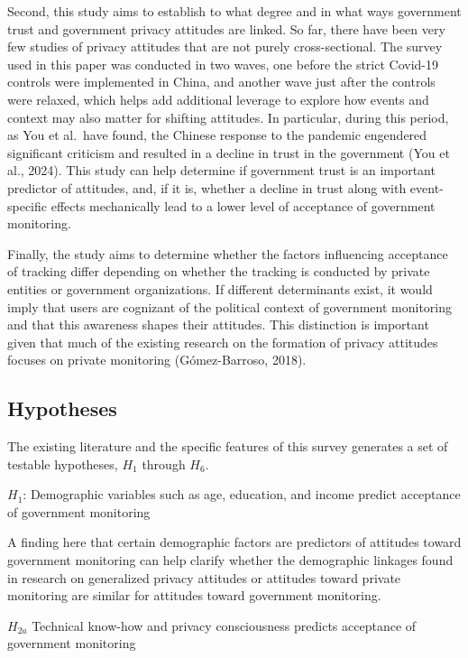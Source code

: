 \documentclass[
  letterpaper,
  DIV=11,
  numbers=noendperiod]{scrartcl}
\begin{document}
Second, this study aims to establish to what degree and in what ways
government trust and government privacy attitudes are linked. So far,
there have been very few studies of privacy attitudes that are not
purely cross-sectional. The survey used in this paper was conducted in
two waves, one before the strict Covid-19 controls were implemented in
China, and another wave just after the controls were relaxed, which
helps add additional leverage to explore how events and context may also
matter for shifting attitudes. In particular, during this period, as You
et al.~have found, the Chinese response to the pandemic engendered
significant criticism and resulted in a decline in trust in the
government (You et al., 2024). This study can help determine if
government trust is an important predictor of attitudes, and, if it is,
whether a decline in trust along with event-specific effects
mechanically lead to a lower level of acceptance of government
monitoring.

Finally, the study aims to determine whether the factors influencing
acceptance of tracking differ depending on whether the tracking is
conducted by private entities or government organizations. If different
determinants exist, it would imply that users are cognizant of the
political context of government monitoring and that this awareness
shapes their attitudes. This distinction is important given that much of
the existing research on the formation of privacy attitudes focuses on
private monitoring (Gómez-Barroso, 2018).

\subsection{Hypotheses}\label{hypotheses}

The existing literature and the specific features of this survey
generates a set of testable hypotheses, \(H_1\) through \(H_6\).

\(H_1\): Demographic variables such as age, education, and income
predict acceptance of government monitoring

A finding here that certain demographic factors are predictors of
attitudes toward government monitoring can help clarify whether the
demographic linkages found in research on generalized privacy attitudes
or attitudes toward private monitoring are similar for attitudes toward
government monitoring.

\(H_{2a}\) Technical know-how and privacy consciousness predicts
acceptance of government monitoring
\end{document}

